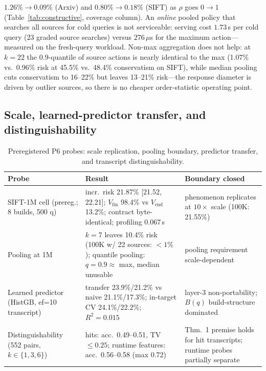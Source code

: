 \documentclass{article}
\begin{document}
$1.26\%\to0.09\%$ (Arxiv) and $0.80\%\to0.18\%$ (SIFT) as $\rho$ goes $0\to1$ (Table~\ref{tab:constructive},
coverage column). An \emph{online} pooled policy that searches all sources for cold queries is not
serviceable: serving cost $1.73$\,s per cold query (23 graded source searches) versus $276\,\mu$s for the
maximum action---measured on the fresh-query workload. Non-max aggregation does not help: at $k{=}22$ the $0.9$-quantile of source
actions is nearly identical to the max (1.07\% vs.\ 0.96\% risk at 45.5\% vs.\ 48.4\% conservatism on
SIFT), while median pooling cuts conservatism to 16--22\% but leaves 13--21\% risk---the response
diameter is driven by outlier sources, so there is no cheaper order-statistic operating point.

\subsection{Scale, learned-predictor transfer, and distinguishability}
\label{sec:scale}

\begin{table}[t]
\centering
\caption{Preregistered P6 probes: scale replication, pooling boundary, predictor transfer, and transcript
distinguishability.}
\label{tab:p6}
\footnotesize
\setlength{\tabcolsep}{3pt}
\begin{tabular}{p{3.2cm}p{6.3cm}p{4.2cm}}
\toprule
Probe & Result & Boundary closed \\
\midrule
SIFT-1M cell (prereg.; 8 builds, 500 q) & incr.\ risk 21.87\% [21.52, 22.21]; $V_{\mathrm{fin}}$ 98.4\% vs $V_{\mathrm{end}}$ 13.2\%; contract byte-identical; profiling 0.067\,s & phenomenon replicates at $10\times$ scale (100K: 21.55\%) \\
Pooling at 1M & $k{=}7$ leaves 10.4\% risk (100K w/ 22 sources: $<1\%$); quantile pooling: $q{=}0.9 \approx$ max, median unusable & pooling requirement scale-dependent \\
Learned predictor (HistGB, ef{=}10 transcript) & transfer 23.9\%/21.2\% vs naive 21.1\%/17.3\%; in-target CV 24.1\%/22.2\%; $R^2=0.015$ & layer-3 non-portability; $B(q)$ build-structure dominated \\
Distinguishability (552 pairs, $k\in\{1,3,6\}$) & hits: acc.\ 0.49--0.51, TV $\le0.25$; runtime features: acc.\ 0.56--0.58 (max 0.72) & Thm.~1 premise holds for hit transcripts; runtime probes partially separate \\
\bottomrule
\end{tabular}
\end{table}
\end{document}
